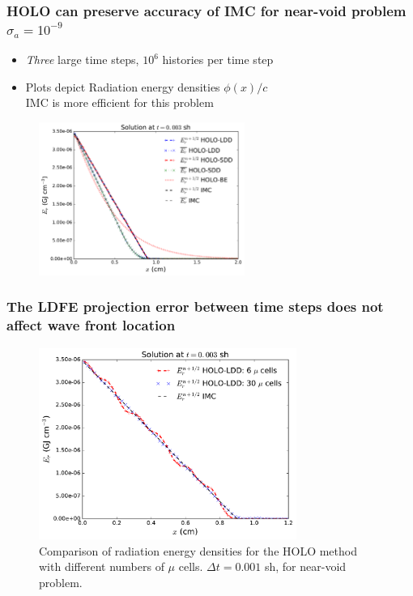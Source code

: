 \documentclass[xcolor=dvipsnames,hyperref={pdfpagelabels=false},unknownkeysallowed]{beamer}
\newcommand{\colG}[1]{{\color{Gray!110} #1}}
\newlength{\wideitemsep}
\let\olditem\item
\renewcommand{\item}{\setlength{\itemsep}{\wideitemsep}\olditem}
\begin{document}
\begin{frame}
    \frametitle{HOLO can preserve accuracy of IMC for near-void problem $\sigma_a=10^{-9}$}
    \begin{itemize}
        \item \emph{Three} large time steps, $10^6$ histories per time step
        \item Plots depict Radiation energy densities $\phi(x)/c$
        \\ \colG{IMC is more efficient for this problem}
    \end{itemize}
        \begin{figure}
\centering
    \includegraphics[width=0.6\textwidth]{void_imc_compare.pdf}
\end{figure}
\end{frame}

\begin{frame}
    \frametitle{The LDFE projection error between time steps does not affect wave front location}
\begin{figure}[H]
  \centering
    \includegraphics[width=0.75\textwidth]{void_ang_compare.pdf}
    \caption{\label{fig:bumps} Comparison of radiation energy densities for
    the HOLO method with different numbers of $\mu$ cells. $\Delta t=0.001$ sh, for
near-void problem.}
\end{figure}
\end{frame}
\end{document}
